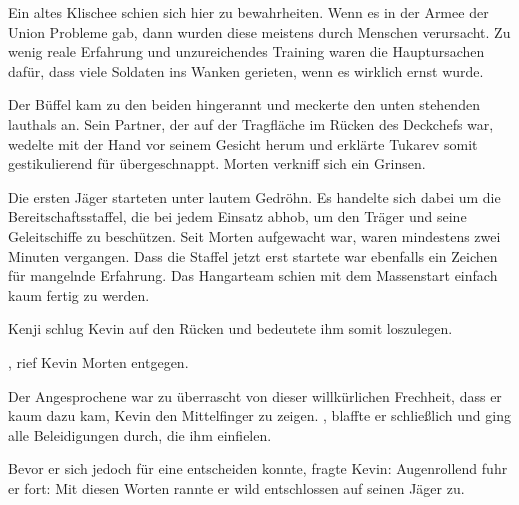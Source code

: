 \par

Ein altes Klischee schien sich hier zu bewahrheiten. Wenn es in der Armee der Union Probleme gab, dann wurden diese meistens durch Menschen verursacht. Zu wenig reale Erfahrung und unzureichendes Training waren die Hauptursachen dafür, dass viele Soldaten ins Wanken gerieten, wenn es wirklich ernst wurde.

\par

Der Büffel kam zu den beiden hingerannt und meckerte den unten stehenden lauthals an. Sein Partner, der auf der Tragfläche im Rücken des Deckchefs war, wedelte mit der Hand vor seinem Gesicht herum und erklärte Tukarev somit gestikulierend für übergeschnappt. Morten verkniff sich ein Grinsen.

\par

Die ersten Jäger starteten unter lautem Gedröhn. Es handelte sich dabei um die Bereitschaftsstaffel, die bei jedem Einsatz abhob, um den Träger und seine Geleitschiffe zu beschützen. Seit Morten aufgewacht war, waren mindestens zwei Minuten vergangen. Dass die Staffel jetzt erst startete war ebenfalls ein Zeichen für mangelnde Erfahrung. Das Hangarteam schien mit dem Massenstart einfach kaum fertig zu werden.

\par

Kenji schlug Kevin auf den Rücken und bedeutete ihm somit loszulegen.

\par

, rief Kevin Morten entgegen. 

\par

Der Angesprochene war zu überrascht von dieser willkürlichen Frechheit, dass er kaum dazu kam, Kevin den Mittelfinger zu zeigen. , blaffte er schließlich und ging alle Beleidigungen durch, die ihm einfielen.

\par

Bevor er sich jedoch für eine entscheiden konnte, fragte Kevin:  Augenrollend fuhr er fort:  Mit diesen Worten rannte er wild entschlossen auf seinen Jäger zu.

